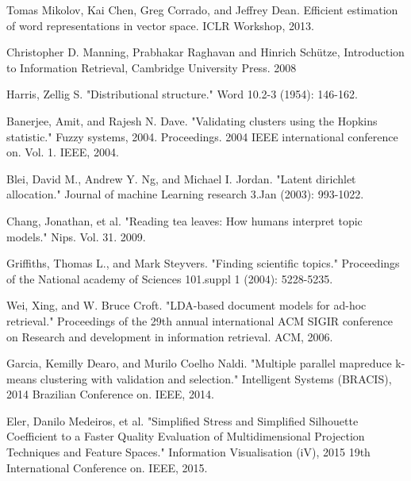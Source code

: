 \documentclass[
	11pt, %
	a4paper, %
	oneside, %
	headinclude,footinclude, %
	BCOR5mm, %
]{scrartcl}
\begin{document}
\vspace{-0.5cm} %
\begin{thebibliography}{12}

    Tomas Mikolov, Kai Chen, Greg Corrado, and Jeffrey Dean. Efficient estimation of word representations
    in vector space. ICLR Workshop, 2013.

	Christopher D. Manning, Prabhakar Raghavan and Hinrich Schütze, Introduction to Information Retrieval, Cambridge University Press. 2008

	Harris, Zellig S. "Distributional structure." Word 10.2-3 (1954): 146-162.

	Banerjee, Amit, and Rajesh N. Dave. "Validating clusters using the Hopkins statistic." Fuzzy systems, 2004. Proceedings. 2004 IEEE international conference on. Vol. 1. IEEE, 2004.

	Blei, David M., Andrew Y. Ng, and Michael I. Jordan. "Latent dirichlet allocation." Journal of machine Learning research 3.Jan (2003): 993-1022.

	Chang, Jonathan, et al. "Reading tea leaves: How humans interpret topic models." Nips. Vol. 31. 2009.

	Griffiths, Thomas L., and Mark Steyvers. "Finding scientific topics." Proceedings of the National academy of Sciences 101.suppl 1 (2004): 5228-5235.

Wei, Xing, and W. Bruce Croft. "LDA-based document models for ad-hoc retrieval." Proceedings of the 29th annual international ACM SIGIR conference on Research and development in information retrieval. ACM, 2006.

	Garcia, Kemilly Dearo, and Murilo Coelho Naldi. "Multiple parallel mapreduce k-means clustering with validation and selection." Intelligent Systems (BRACIS), 2014 Brazilian Conference on. IEEE, 2014.

	Eler, Danilo Medeiros, et al. "Simplified Stress and Simplified Silhouette Coefficient to a Faster Quality Evaluation of Multidimensional Projection Techniques and Feature Spaces." Information Visualisation (iV), 2015 19th International Conference on. IEEE, 2015.

\end{thebibliography}

\end{document}
